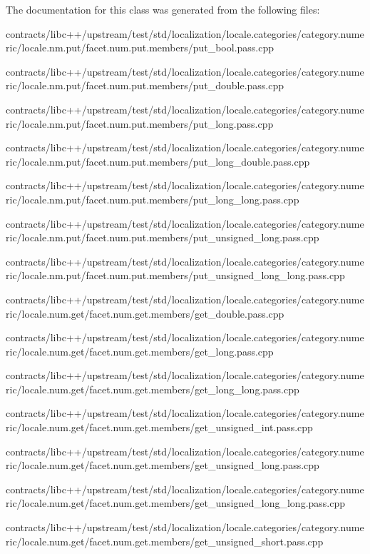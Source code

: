 The documentation for this class was generated from the following files\+:\begin{DoxyCompactItemize}
\item 
contracts/libc++/upstream/test/std/localization/locale.\+categories/category.\+numeric/locale.\+nm.\+put/facet.\+num.\+put.\+members/put\+\_\+bool.\+pass.\+cpp\item 
contracts/libc++/upstream/test/std/localization/locale.\+categories/category.\+numeric/locale.\+nm.\+put/facet.\+num.\+put.\+members/put\+\_\+double.\+pass.\+cpp\item 
contracts/libc++/upstream/test/std/localization/locale.\+categories/category.\+numeric/locale.\+nm.\+put/facet.\+num.\+put.\+members/put\+\_\+long.\+pass.\+cpp\item 
contracts/libc++/upstream/test/std/localization/locale.\+categories/category.\+numeric/locale.\+nm.\+put/facet.\+num.\+put.\+members/put\+\_\+long\+\_\+double.\+pass.\+cpp\item 
contracts/libc++/upstream/test/std/localization/locale.\+categories/category.\+numeric/locale.\+nm.\+put/facet.\+num.\+put.\+members/put\+\_\+long\+\_\+long.\+pass.\+cpp\item 
contracts/libc++/upstream/test/std/localization/locale.\+categories/category.\+numeric/locale.\+nm.\+put/facet.\+num.\+put.\+members/put\+\_\+unsigned\+\_\+long.\+pass.\+cpp\item 
contracts/libc++/upstream/test/std/localization/locale.\+categories/category.\+numeric/locale.\+nm.\+put/facet.\+num.\+put.\+members/put\+\_\+unsigned\+\_\+long\+\_\+long.\+pass.\+cpp\item 
contracts/libc++/upstream/test/std/localization/locale.\+categories/category.\+numeric/locale.\+num.\+get/facet.\+num.\+get.\+members/get\+\_\+double.\+pass.\+cpp\item 
contracts/libc++/upstream/test/std/localization/locale.\+categories/category.\+numeric/locale.\+num.\+get/facet.\+num.\+get.\+members/get\+\_\+long.\+pass.\+cpp\item 
contracts/libc++/upstream/test/std/localization/locale.\+categories/category.\+numeric/locale.\+num.\+get/facet.\+num.\+get.\+members/get\+\_\+long\+\_\+long.\+pass.\+cpp\item 
contracts/libc++/upstream/test/std/localization/locale.\+categories/category.\+numeric/locale.\+num.\+get/facet.\+num.\+get.\+members/get\+\_\+unsigned\+\_\+int.\+pass.\+cpp\item 
contracts/libc++/upstream/test/std/localization/locale.\+categories/category.\+numeric/locale.\+num.\+get/facet.\+num.\+get.\+members/get\+\_\+unsigned\+\_\+long.\+pass.\+cpp\item 
contracts/libc++/upstream/test/std/localization/locale.\+categories/category.\+numeric/locale.\+num.\+get/facet.\+num.\+get.\+members/get\+\_\+unsigned\+\_\+long\+\_\+long.\+pass.\+cpp\item 
contracts/libc++/upstream/test/std/localization/locale.\+categories/category.\+numeric/locale.\+num.\+get/facet.\+num.\+get.\+members/get\+\_\+unsigned\+\_\+short.\+pass.\+cpp\end{DoxyCompactItemize}
